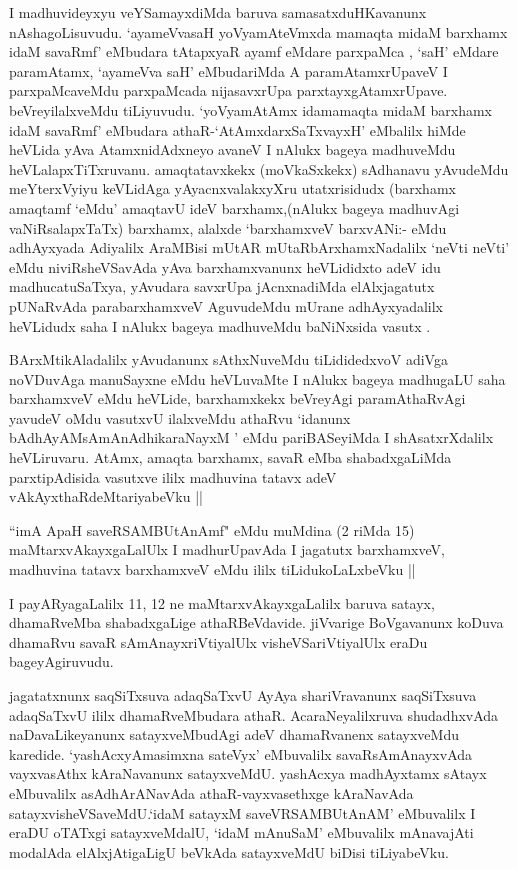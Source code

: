 \begin{artha}
 I madhuvideyxyu veYSamayxdiMda baruva samasatxduHKavanunx nAshagoLisuvudu. `ayameVvasaH yoV\s yamAteVmxda mamaqta midaM barxhamx idaM savaRmf' eMbudara tAtapxyaR ayamf eMdare parxpaMca , `saH' eMdare paramAtamx, `ayameVva saH' eMbudariMda A paramAtamxrUpaveV I parxpaMcaveMdu parxpaMcada nijasavxrUpa parxtayxgAtamxrUpave. beVreyilalxveMdu tiLiyuvudu. `yoV\s yamAtAmx idamamaqta midaM barxhamx idaM savaRmf' eMbudara athaR-`AtAmxdarxSaTxvayxH' eMbalilx hiMde heVLida yAva AtamxnidAdxneyo avaneV I nAlukx bageya madhuveMdu heVLalapxTiTxruvanu. amaqtatavxkekx (moVkaSxkekx) sAdhanavu yAvudeMdu meYterxVyiyu keVLidAga yAyacnxvalakxyXru utatxrisidudx (barxhamx amaqtamf `eMdu' amaqtavU ideV barxhamx,(nAlukx bageya madhuvAgi vaNiRsalapxTaTx) barxhamx, alalxde `barxhamxveV barxvANi:- eMdu adhAyxyada Adiyalilx AraMBisi mUtAR mUtaRbArxhamxNadalilx `neVti neVti' eMdu niviRsheVSavAda yAva barxhamxvanunx heVLididxto adeV idu madhucatuSaTxya, yAvudara savxrUpa jAcnxnadiMda elAlxjagatutx pUNaRvAda parabarxhamxveV AguvudeMdu mUrane adhAyxyadalilx heVLidudx saha I nAlukx bageya madhuveMdu baNiNxsida vasutx .
\end{artha}

\begin{artha}
BArxMtikAladalilx yAvudanunx sAthxNuveMdu tiLididedxvoV adiVga noVDuvAga manuSayxne eMdu 
heVLuvaMte I nAlukx bageya madhugaLU saha barxhamxveV eMdu heVLide, barxhamxkekx 
beVreyAgi paramAthaRvAgi yavudeV oMdu vasutxvU ilalxveMdu athaRvu `idanunx 
bAdhAyAMsAmAnAdhikaraNayxM ' eMdu pariBASeyiMda I shAsatxrXdalilx heVLiruvaru. AtAmx, 
amaqta barxhamx, savaR eMba shabadxgaLiMda parxtipAdisida vasutxve ililx madhuvina 
tatavx adeV vAkAyxthaRdeMtariyabeVku ||

``imA ApaH saveRSAMBUtAnAmf" eMdu muMdina (2 riMda 15) maMtarxvAkayxgaLalUlx I madhurUpavAda I jagatutx barxhamxveV, madhuvina tatavx barxhamxveV eMdu ililx tiLidukoLaLxbeVku ||
\end{artha}

\begin{artha}
I payARyagaLalilx 11, 12 ne maMtarxvAkayxgaLalilx baruva satayx, dhamaRveMba shabadxgaLige athaRBeVdavide. jiVvarige BoVgavanunx koDuva dhamaRvu savaR sAmAnayxriVtiyalUlx visheVSariVtiyalUlx eraDu bageyAgiruvudu.

jagatatxnunx saqSiTxsuva adaqSaTxvU AyAya shariVravanunx saqSiTxsuva adaqSaTxvU ililx dhamaRveMbudara  athaR. AcaraNeyalilxruva shudadhxvAda naDavaLikeyanunx satayxveMbudAgi adeV dhamaRvanenx satayxveMdu karedide. `yashAcxyAmasimxna sateVyx' eMbuvalilx savaRsAmAnayxvAda vayxvasAthx kAraNavanunx satayxveMdU. yashAcxya madhAyxtamx sAtayx eMbuvalilx asAdhArANavAda athaR-vayxvasethxge kAraNavAda satayxvisheVSaveMdU.`idaM satayxM saveVRSAMBUtAnAM' eMbuvalilx I eraDU oTATxgi satayxveMdalU, `idaM mAnuSaM' eMbuvalilx mAnavajAti modalAda elAlxjAtigaLigU beVkAda satayxveMdU biDisi tiLiyabeVku.
\end{artha}


